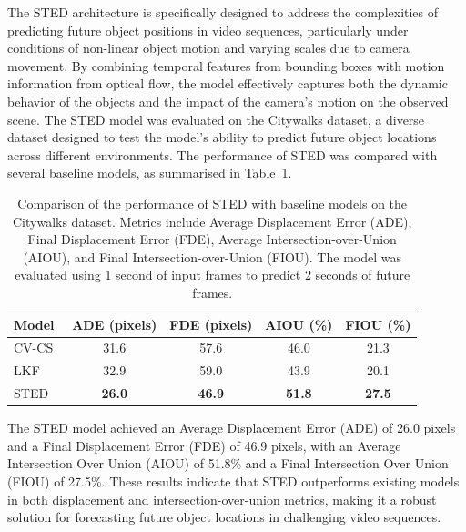 \documentclass[12pt,oneside]{book} %
\begin{document}
The STED architecture is specifically designed to address the complexities of
predicting future object positions in video sequences, particularly under
conditions of non-linear object motion and varying scales due to camera
movement. By combining temporal features from bounding boxes with motion
information from optical flow, the model effectively captures both the dynamic
behavior of the objects and the impact of the camera's motion on the observed
scene. The STED model was evaluated on the Citywalks dataset, a diverse dataset
designed to test the model's ability to predict future object locations across
different environments. The performance of STED was compared with several
baseline models, as summarised in Table~\ref{tab:sted-results}.

\begin{table}[H]
    \centering
    \caption{Comparison of the performance of STED with baseline models on the Citywalks dataset. Metrics include Average Displacement Error (ADE), Final Displacement Error (FDE), Average Intersection-over-Union (AIOU), and Final Intersection-over-Union (FIOU). The model was evaluated using 1 second of input frames to predict 2 seconds of future frames.}
    \begin{adjustbox}{max width=\textwidth}
        \begin{tabular}{lcccc}
            \toprule
            \textbf{Model}                         & \textbf{ADE (pixels)} & \textbf{FDE (pixels)} & \textbf{AIOU (\%)} & \textbf{FIOU (\%)} \\ 
            \midrule
            CV-CS~\cite{MultipleObjectForecasting} & 31.6                  & 57.6                  & 46.0               & 21.3               \\
            LKF~\cite{MultipleObjectForecasting}   & 32.9                  & 59.0                  & 43.9               & 20.1               \\
            STED~\cite{MultipleObjectForecasting}  & \textbf{26.0}         & \textbf{46.9}         & \textbf{51.8}      & \textbf{27.5}      \\
            \bottomrule
        \end{tabular}
    \end{adjustbox}
    \label{tab:sted-results}
\end{table}

The STED model achieved an Average Displacement Error (ADE) of 26.0 pixels and
a Final Displacement Error (FDE) of 46.9 pixels, with an Average Intersection
Over Union (AIOU) of 51.8\% and a Final Intersection Over Union (FIOU) of
27.5\%. These results indicate that STED outperforms existing models in both
displacement and intersection-over-union metrics, making it a robust solution
for forecasting future object locations in challenging video sequences.
\end{document}
